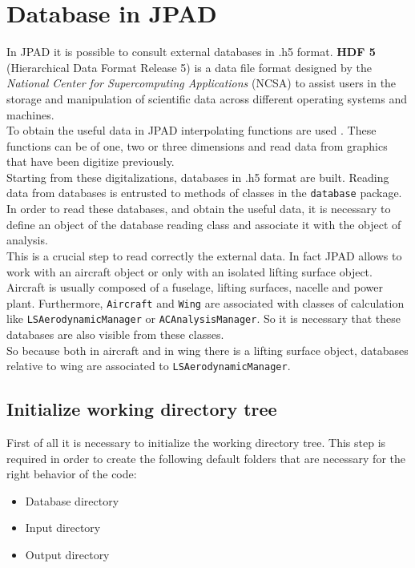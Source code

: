 \section {Database in JPAD}

In JPAD it is possible to consult external databases in .h5 format. {\bfseries HDF 5} (Hierarchical Data Format Release 5) is a data file format designed by the {\itshape National Center for Supercomputing Applications} (NCSA) to assist users in the storage and manipulation of scientific data across different operating systems and machines.\\
To obtain the useful data in JPAD  interpolating functions are used . These functions can be of one, two or three dimensions and read data from graphics that have been digitize previously.\\
Starting from these digitalizations, databases in .h5 format are built.
Reading data from databases is entrusted to methods of classes in the \texttt{database} package.\\
In order to read these databases, and obtain the useful data, it is necessary to define an object of the database reading class and associate it with the object of analysis.\\
This is a crucial step to read correctly the external data. In fact JPAD allows to work with an aircraft object  or only with an isolated lifting surface object.  Aircraft is usually composed of a fuselage, lifting surfaces, nacelle and power plant.
Furthermore, \texttt{Aircraft} and \texttt{Wing} are associated with classes of calculation like \texttt{LSAerodynamicManager} or \texttt{ACAnalysisManager}. So it is necessary that these databases are also visible from these classes.\\
So because  both in aircraft and in wing there is a lifting surface object, databases relative to wing are associated to \texttt{LSAerodynamicManager}.


\subsection {Initialize working directory tree}

First of all it is necessary to initialize the working directory tree. This step is required in order to create the following default folders that are necessary for the right behavior of the code:

\begin{itemize}
\item Database directory
\item Input directory
\item Output directory
\end{itemize}


